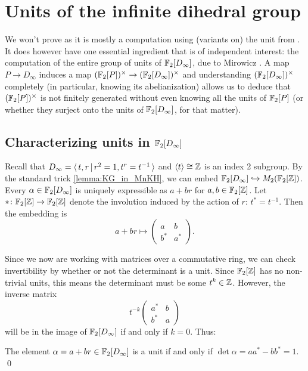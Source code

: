 \section{Units of the infinite dihedral group}

We won't prove  as it is mostly a computation using (variants on) the unit from .
It does however have one essential ingredient that is of independent interest: the computation of the entire group of units of $\mathbb{F}_2[D_\infty]$, due to Mirowicz \cite{Mirowicz91}.
A map $P \to D_\infty$ induces a map $(\mathbb{F}_2[P])^\times \to (\mathbb{F}_2[D_\infty])^\times$ and understanding $(\mathbb{F}_2[D_\infty])^\times$ completely (in particular, knowing its abelianization) allows us to deduce that $(\mathbb{F}_2[P])^\times$ is not finitely generated without even knowing all the units of $\mathbb{F}_2[P]$ (or whether they surject onto the units of $\mathbb{F}_2[D_\infty]$, for that matter).

\subsection*{Characterizing units in $\mathbb{F}_2[D_\infty]$}

Recall that $D_\infty = \langle \, t, r \, | \, r^2 = 1, t^r = t^{-1} \, \rangle$ and $\langle t \rangle \cong \mathbb{Z}$ is an index 2 subgroup.
By the standard trick \ref{lemma:KG_in_MnKH}, we can embed $\mathbb{F}_2[D_\infty] \hookrightarrow M_2(\mathbb{F}_2[\mathbb{Z}])$.
Every $\alpha \in \mathbb{F}_2[D_\infty]$ is uniquely expressible as $a + br$ for $a, b \in \mathbb{F}_2[\mathbb{Z}]$.
Let $* \colon \mathbb{F}_2[\mathbb{Z}] \to \mathbb{F}_2[\mathbb{Z}]$ denote the involution induced by the action of $r$: $t^* = t^{-1}$.
Then the embedding is \[
    a + br \mapsto \begin{pmatrix} a & b \\ b^* & a^* \end{pmatrix}.
\]

Since we now are working with matrices over a commutative ring, we can check invertibility by whether or not the determinant is a unit.
Since $\mathbb{F}_2[\mathbb{Z}]$ has no non-trivial units, this means the determinant must be some $t^k \in \mathbb{Z}$.
However, the inverse matrix \[
    t^{-k} \begin{pmatrix} a^* & b \\ b^* & a \end{pmatrix}
    \] will be in the image of $\mathbb{F}_2[D_\infty]$ if and only if $k = 0$.
Thus:

\begin{lemma}
    The element $\alpha = a + br \in \mathbb{F}_2[D_\infty]$ is a unit if and only if $\det \alpha = a a^* - b b^* = 1$. \qed
\end{lemma}

